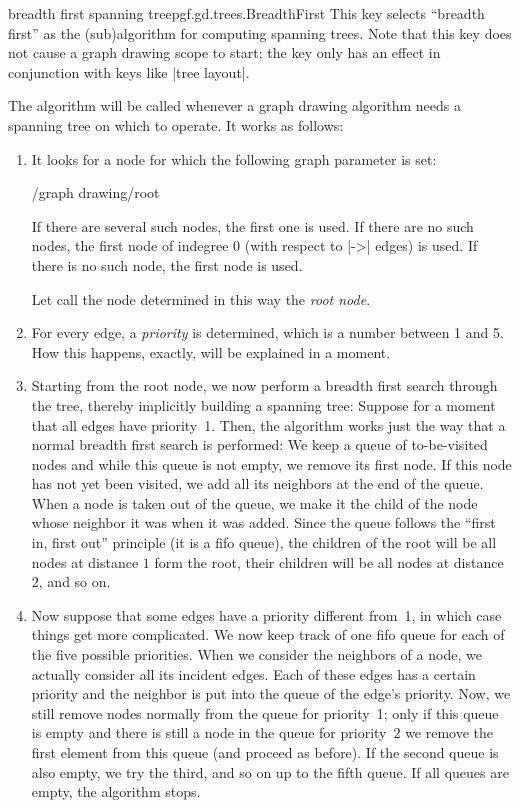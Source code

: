 \begin{gdalgorithm}{breadth first spanning tree}{pgf.gd.trees.BreadthFirst}
  This key selects ``breadth first'' as the (sub)algorithm for
  computing spanning trees. Note that this key does not cause a graph
  drawing scope to start; the key only has an effect in conjunction
  with keys like |tree layout|.

  The algorithm will be called whenever a graph drawing algorithm
  needs a spanning tree on which to operate. It works as follows:
  
  \begin{enumerate}
  \item It looks for a node for which the following graph parameter is
    set:
    \begin{key}{/graph drawing/root}
    \end{key}
    If there are several such nodes, the first one is used. If there
    are no such nodes, the first node of indegree 0 (with respect to
    |->| edges) is used. If there is no such node, the first node is
    used.

    Let call the node determined in this way the \emph{root node}.
  \item For every edge, a \emph{priority} is determined, which is a
    number between 1 and 5. How this happens, exactly, will be
    explained in a moment.
  \item Starting from the root node, we now perform a breadth first
    search through the tree, thereby implicitly building a spanning
    tree: Suppose for a moment that all edges have priority~1. Then,
    the algorithm works just the way that a normal breadth first
    search is performed: We keep a queue of to-be-visited nodes and
    while this queue is not empty, we remove its first node. If this
    node has not yet been visited, we add all its neighbors at the
    end of the queue. When a node is taken out of the queue, we make
    it the child of the node whose neighbor it was when it was
    added. Since the queue follows the ``first in, first out''
    principle (it is a fifo queue), the children of the root will be
    all nodes at distance $1$ form the root, their children will be
    all nodes at distance $2$, and so on. 
  \item Now suppose that some edges have a priority different
    from~1, in which case things get more complicated. We now keep
    track of one fifo queue for each of the five possible
    priorities. When we consider the neighbors of a node, we actually
    consider all its incident edges. Each of these edges has a certain
    priority and the neighbor is put into the queue of the edge's
    priority. Now, we still remove nodes normally from the queue for
    priority~1; only if this queue is empty and there is still a node
    in the queue for priority~2 we remove the first element from this
    queue (and proceed as before). If the second queue is also empty,
    we try the third, and so on up to the fifth queue. If all queues
    are empty, the algorithm stops.
  \end{enumerate}


\end{gdalgorithm}
